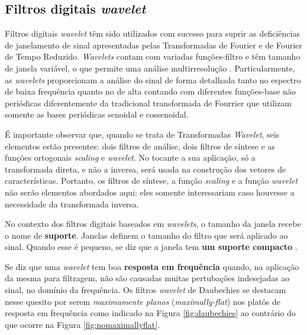 		\subsection{Filtros digitais \textit{wavelet}}
			\par Filtros digitais \textit{wavelet} têm sido utilizados com sucesso para suprir as deficiências de janelamento de sinal apresentadas pelas Transformadas de Fourier e de Fourier de Tempo Reduzido. \textit{Wavelets} contam com variadas funções-filtro e têm tamanho de janela variável, o que permite uma análise multirresolução \cite{Rod5254905}. Particularmente, as \textit{wavelets} proporcionam a análise do sinal de forma detalhada tanto no espectro de baixa frequência quanto no de alta contando com diferentes funções-base não periódicas diferentemente da tradicional transformada de Fourrier que utilizam somente as bases periódicas senoidal e cossenoidal.
			
			\par É importante observar que, quando se trata de Transformadas \textit{Wavelet}, seis elementos estão presentes: dois filtros de análise, dois filtros de síntese e as funções ortogonais \textit{scaling} e \textit{wavelet}. No tocante a sua aplicação, só a transformada direta, e não a inversa, será usada na construção dos vetores de características. Portanto, os filtros de síntese, a função \textit{scaling} e a função \textit{wavelet} não serão elementos abordados aqui: eles somente interessariam caso houvesse a necessidade da transformada inversa.

			\par No contexto dos filtros digitais baseados em \textit{wavelets}, o tamanho da janela recebe o nome de \textbf{suporte}. Janelas definem o tamanho do filtro que será aplicado ao sinal. Quando esse é pequeno, se diz que a janela tem \textbf{um suporte compacto} \cite{robi2003}.
		
			\par Se diz que uma \textit{wavelet} tem boa \textbf{resposta em frequência} quando, na aplicação da mesma para filtragem, não são causadas muitas pertubações indesejadas ao sinal, no domínio da frequência. Os filtros \textit{wavelet} de Daubechies \cite{daubechies1992ten} se destacam nesse quesito por serem \textit{maximamente planos} (\textit{maximally-flat}) \cite{butterworth1930} \cite{bianchi2007electronic} nos platôs de resposta em frequência como indicado na Figura \ref{fig:daubechies} ao contrário do que ocorre na Figura \ref{fig:nomaximallyflat}.

